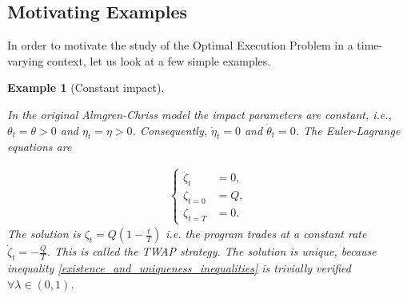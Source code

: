 \documentclass[final,3p,authoryear,12pt]{elsarticle}
\newtheorem{example}{Example}
\begin{document}
\subsection{Motivating Examples}

In order to motivate the study of the Optimal Execution Problem in a time-varying context, let us look at a few simple examples.

\begin{example}[Constant impact]
\label{example:_constant_impact_CT}

In the original Almgren-Chriss model the impact parameters are constant, i.e., $\theta_{t}=\theta>0$ and $\eta_{t}=\eta>0$. Consequently, $\dot{\eta}_t=0$ and $\dot{\theta}_t=0$. The Euler-Lagrange equations are


\begin{align}
    \begin{cases}
    \ddot \zeta_{t} &= 0,\\
    \zeta_{t=0}&=Q,\\
    \zeta_{t=T}&=0.
\end{cases}
\end{align}
The solution is $\zeta_t=Q(1-\frac{t}{T})$ i.e. the program trades at a constant rate $ \dot \zeta_{t} = -\frac{Q}{T}$. This is called the TWAP strategy. The solution is unique, because inequality \eqref{existence_and_uniqueness_inequalities} is trivially verified $\forall \lambda \in (0,1)$.
\end{example}
\end{document}
